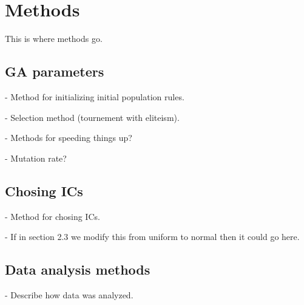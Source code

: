 
\section{Methods} \label{sec:methods}

This is where methods go.

\subsection{GA parameters}

- Method for initializing initial population rules.

- Selection method (tournement with eliteism).

- Methods for speeding things up?

- Mutation rate?

\subsection{Chosing ICs}

- Method for chosing ICs.

- If in section 2.3 we modify this from uniform to normal then it could go here.

\subsection{Data analysis methods}

- Describe how data was analyzed.




